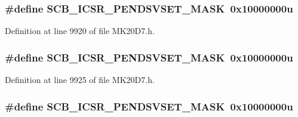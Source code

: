 \subsubsection[{\texorpdfstring{S\+C\+B\+\_\+\+I\+C\+S\+R\+\_\+\+P\+E\+N\+D\+S\+V\+S\+E\+T\+\_\+\+M\+A\+SK}{SCB_ICSR_PENDSVSET_MASK}}]{\setlength{\rightskip}{0pt plus 5cm}\#define S\+C\+B\+\_\+\+I\+C\+S\+R\+\_\+\+P\+E\+N\+D\+S\+V\+S\+E\+T\+\_\+\+M\+A\+SK~0x10000000u}\hypertarget{group___s_c_b___register___masks_ga5ed59a5d03a7d25ef76aa9d92e25e4a5}{}\label{group___s_c_b___register___masks_ga5ed59a5d03a7d25ef76aa9d92e25e4a5}


Definition at line 9920 of file M\+K20\+D7.\+h.

\subsubsection[{\texorpdfstring{S\+C\+B\+\_\+\+I\+C\+S\+R\+\_\+\+P\+E\+N\+D\+S\+V\+S\+E\+T\+\_\+\+M\+A\+SK}{SCB_ICSR_PENDSVSET_MASK}}]{\setlength{\rightskip}{0pt plus 5cm}\#define S\+C\+B\+\_\+\+I\+C\+S\+R\+\_\+\+P\+E\+N\+D\+S\+V\+S\+E\+T\+\_\+\+M\+A\+SK~0x10000000u}\hypertarget{group___s_c_b___register___masks_ga5ed59a5d03a7d25ef76aa9d92e25e4a5}{}\label{group___s_c_b___register___masks_ga5ed59a5d03a7d25ef76aa9d92e25e4a5}


Definition at line 9925 of file M\+K20\+D7.\+h.

\subsubsection[{\texorpdfstring{S\+C\+B\+\_\+\+I\+C\+S\+R\+\_\+\+P\+E\+N\+D\+S\+V\+S\+E\+T\+\_\+\+M\+A\+SK}{SCB_ICSR_PENDSVSET_MASK}}]{\setlength{\rightskip}{0pt plus 5cm}\#define S\+C\+B\+\_\+\+I\+C\+S\+R\+\_\+\+P\+E\+N\+D\+S\+V\+S\+E\+T\+\_\+\+M\+A\+SK~0x10000000u}\hypertarget{group___s_c_b___register___masks_ga5ed59a5d03a7d25ef76aa9d92e25e4a5}{}\label{group___s_c_b___register___masks_ga5ed59a5d03a7d25ef76aa9d92e25e4a5}


